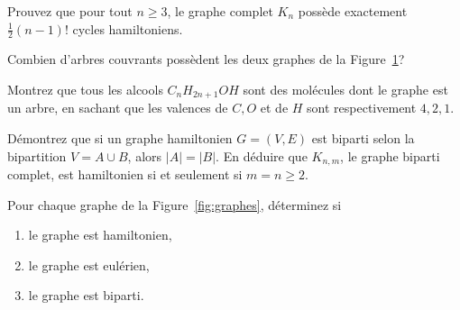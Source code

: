 \begin{exo}
Prouvez que pour tout $n \geq 3$, le graphe complet $K_n$ poss\`ede exactement $\frac{1}{2}(n-1)!$ cycles hamiltoniens.
\end{exo}

\begin{exo}
Combien d'arbres couvrants poss\`edent les deux graphes de la Figure~\ref{fig:arbrecouvrant}?
\end{exo}

\begin{figure}[!h]
\centering
{}
\caption{}
\label{fig:arbrecouvrant}
\end{figure}

\begin{exo}
Montrez que tous les alcools $C_nH_{2n+1}OH$ sont des mol\'ecules dont le graphe est un arbre, en sachant que les valences de $C, O$ et de $H$ sont respectivement $4, 2, 1$.
\end{exo}

\begin{exo}
D\'emontrez que si un graphe hamiltonien $G = (V,E)$ est biparti selon la bipartition $V = A \cup B$, alors $|A|= |B|$. En d\'eduire que $K_{n,m}$, le graphe biparti complet, est hamiltonien si et seulement si $m=n \geq 2$.

\end{exo}

\begin{exo}
Pour chaque graphe de la Figure~\ref{fig:graphes}, d\'eterminez si 
\begin{enumerate}
\item le graphe est hamiltonien,
\item le graphe est eul\'erien,
\item le graphe est biparti.
\end{enumerate}
\end{exo}

